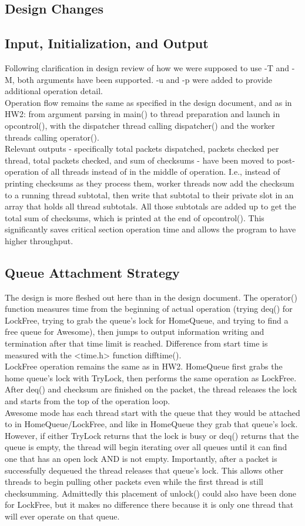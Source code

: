 \documentclass{article}
\begin{document}
\begin{adjustwidth}{-2cm}{-2cm}
\section{Design Changes}
\subsection{Input, Initialization, and Output}
Following clarification in design review of how we were supposed to use -T and -M, both arguments have been supported. -u and -p were added to provide additional operation detail.\\
Operation flow remains the same as specified in the design document, and as in HW2: from argument parsing in main() to thread preparation and launch in opcontrol(), with the dispatcher thread calling dispatcher() and the worker threads calling operator().\\
Relevant outputs - specifically total packets dispatched, packets checked per thread, total packets checked, and sum of checksums - have been moved to post-operation of all threads instead of in the middle of operation. I.e., instead of printing checksums as they process them, worker threads now add the checksum to a running thread subtotal, then write that subtotal to their private slot in an array that holds all thread subtotals. All those subtotals are added up to get the total sum of checksums, which is printed at the end of opcontrol(). This significantly saves critical section operation time and allows the program to have higher throughput.
\subsection{Queue Attachment Strategy}
The design is more fleshed out here than in the design document. The operator() function measures time from the beginning of actual operation (trying deq() for LockFree, trying to grab the queue's lock for HomeQueue, and trying to find a free queue for Awesome), then jumps to output information writing and termination after that time limit is reached. Difference from start time is measured with the <time.h> function difftime().\\
LockFree operation remains the same as in HW2. HomeQueue first grabs the home queue's lock with TryLock, then performs the same operation as LockFree. After deq() and checksum are finished on the packet, the thread releases the lock and starts from the top of the operation loop.\\
Awesome mode has each thread start with the queue that they would be attached to in HomeQueue/LockFree, and like in HomeQueue they grab that queue's lock. However, if either TryLock returns that the lock is busy or deq() returns that the queue is empty, the thread will begin iterating over all queues until it can find one that has an open lock AND is not empty. Importantly, after a packet is successfully dequeued the thread releases that queue's lock. This allows other threads to begin pulling other packets even while the first thread is still checksumming. Admittedly this placement of unlock() could also have been done for LockFree, but it makes no difference there because it is only one thread that will ever operate on that queue.


\end{adjustwidth}
\end{document}
